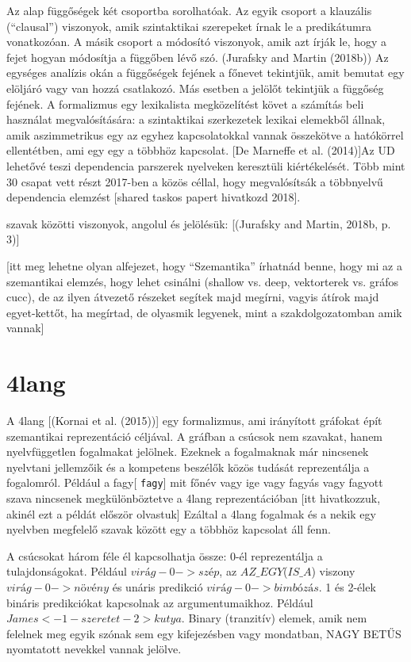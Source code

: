 Az alap függőségek két csoportba sorolhatóak. Az egyik csoport a klauzális (“clausal”) viszonyok, amik szintaktikai szerepeket írnak le a predikátumra vonatkozóan. A másik csoport a módosító viszonyok, amik azt írják le, hogy a fejet hogyan módosítja a függőben lévő szó. (Jurafsky and Martin (2018b)) Az egységes analízis okán a függőségek fejének a főnevet tekintjük, amit bemutat egy elöljáró vagy van hozzá csatlakozó. Más esetben a jelölőt tekintjük a függőség fejének. A formalizmus egy lexikalista megközelítést követ a számítás beli használat megvalósítására: a szintaktikai szerkezetek  lexikai elemekből állnak, amik aszimmetrikus egy az egyhez kapcsolatokkal vannak összekötve a hatókörrel ellentétben, ami egy egy a többhöz kapcsolat.  [De Marneffe et al. (2014)]Az UD lehetővé teszi dependencia parszerek nyelveken keresztüli kiértékelését. Több mint 30 csapat vett részt 2017-ben a közös céllal, hogy megvalósítsák a többnyelvű dependencia elemzést [shared taskos papert hivatkozd 2018].

szavak közötti viszonyok, angolul és jelölésük:
[(Jurafsky and Martin, 2018b, p. 3)]

[itt meg lehetne olyan alfejezet, hogy “Szemantika”
írhatnád benne, hogy mi az a szemantikai elemzés, hogy lehet csinálni (shallow vs. deep, vektorterek vs. gráfos cucc), de az ilyen átvezető részeket segítek majd megírni, vagyis átírok majd egyet-kettőt, ha megírtad, de olyasmik legyenek, mint a szakdolgozatomban amik vannak]


\section{4lang}
A 4lang  [(Kornai et al. (2015))] egy formalizmus, ami irányított gráfokat épít szemantikai reprezentáció céljával. A gráfban a csúcsok nem szavakat, hanem nyelvfüggetlen fogalmakat jelölnek. Ezeknek a fogalmaknak már nincsenek nyelvtani jellemzőik és a kompetens beszélők közös tudását reprezentálja a fogalomról. Például a fagy[ \texttt{fagy}] mit főnév vagy ige vagy fagyás vagy fagyott szava nincsenek megkülönböztetve a 4lang reprezentációban [itt hivatkozzuk, akinél ezt a példát először olvastuk] Ezáltal a 4lang fogalmak és a nekik egy nyelvben megfelelő szavak között egy a többhöz kapcsolat áll fenn.

A csúcsokat három féle él kapcsolhatja össze:
0-él reprezentálja a tulajdonságokat. Például $virág -0-> szép$, az $AZ\_EGY$($IS\_A$) viszony $virág -0->  növény$ és unáris predikció $virág -0-> bimbózás$.
1 és 2-élek bináris predikciókat kapcsolnak az argumentumaikhoz. Például $James <-1- szeretet -2> kutya$.
Binary (tranzitív) elemek, amik nem felelnek meg egyik szónak sem egy kifejezésben vagy mondatban, NAGY BETŰS nyomtatott nevekkel vannak jelölve.

